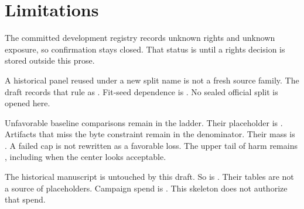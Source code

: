 \section{Limitations}
The committed development registry records unknown rights and unknown exposure, so confirmation stays closed.
That status is  until a rights decision is stored outside this prose.

A historical panel reused under a new split name is not a fresh source family.
The draft records that rule as .
Fit-seed dependence is .
No sealed official split is opened here.

Unfavorable baseline comparisons remain in the ladder.
Their placeholder is .
Artifacts that miss the byte constraint remain in the denominator.
Their mass is .
A failed cap is not rewritten as a favorable loss.
The upper tail of harm remains , including when the center looks acceptable.

The historical manuscript  is untouched by this draft.
So is .
Their tables are not a source of placeholders.
Campaign spend is .
This skeleton does not authorize that spend.
